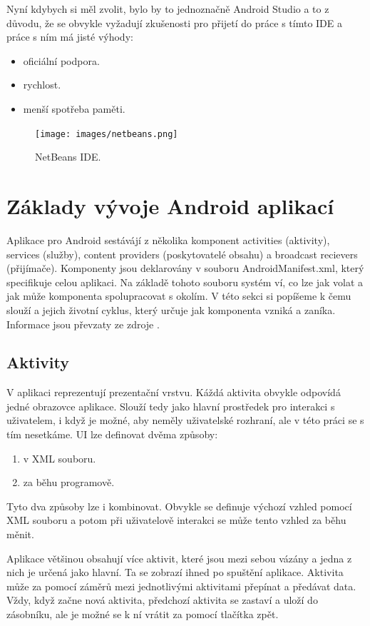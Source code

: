 \documentclass[12pt]{article}
\begin{document}
Nyní kdybych si měl zvolit, bylo by to jednoznačně Android Studio a to z důvodu, že se obvykle vyžadují zkušenosti pro přijetí do práce s tímto IDE a práce s ním má jisté výhody:
\begin{itemize}
\item oficiální podpora.
\item rychlost.
\item menší spotřeba paměti.
\end{itemize}
\begin{figure}[ht]
\centerline{\texttt{[image: images/netbeans.png]}}
\caption{NetBeans IDE.} \label{netbeans}
\end{figure}
\newpage
\section{Základy vývoje Android aplikací}
Aplikace pro Android sestávájí z několika komponent activities (aktivity), services (služby), content providers (poskytovatelé obsahu) a broadcast recievers (přijímače). Komponenty jsou deklarovány v souboru AndroidManifest.xml, který specifikuje celou aplikaci. Na základě tohoto souboru systém ví, co lze jak volat a jak může komponenta spolupracovat s okolím. V této sekci si popíšeme k čemu slouží a jejich životní cyklus, který určuje jak komponenta vzniká a zaníka. Informace jsou převzaty ze zdroje \cite{slozeni}.
\subsection{Aktivity}
\label{aktivity}
V aplikaci reprezentují prezentační vrstvu. Káždá aktivita obvykle odpovídá jedné obrazovce aplikace. Slouží tedy jako hlavní prostředek pro interakci s uživatelem, i když je možné, aby neměly uživatelské rozhraní, ale v této práci se s tím nesetkáme. UI lze definovat dvěma způsoby:
\begin{enumerate}
\item v XML souboru.
\item za běhu programově.
\end{enumerate}
Tyto dva způsoby lze i kombinovat. Obvykle se definuje výchozí vzhled pomocí XML souboru a potom při uživatelově interakci se může tento vzhled za běhu měnit.

Aplikace většinou obsahují více aktivit, které jsou mezi sebou vázány a jedna z nich je určená jako hlavní. Ta se zobrazí ihned po spuštění aplikace. Aktivita může za pomocí záměrů mezi jednotlivými aktivitami přepínat a předávat data. Vždy, když začne nová aktivita, předchozí aktivita se zastaví a uloží do zásobníku, ale je možné se k ní vrátit za pomocí tlačítka zpět.
\end{document}
